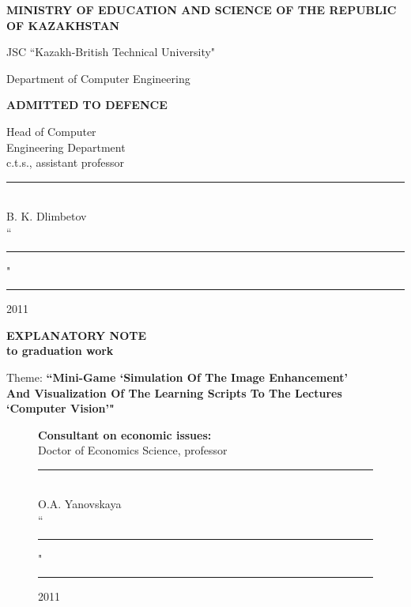 \begin{titlepage}
	\pagestyle{empty}
	\begin{center}
		{\bf{\MakeUppercase{Ministry of education and science of the republic of Kazakhstan}}

		\vspace{12pt}

		JSC ``Kazakh-British Technical University"


		Department of Computer Engineering}

		\begin{flushright}
			{\bf \MakeUppercase{Admitted to defence}}

			Head of Computer\\
			Engineering Department\\
			c.t.s., assistant professor\\
			\vspace{0.5\baselineskip}
			\rule{13em}{0.4pt}\\
			B. K. Dlimbetov\\
			\vspace{0.5\baselineskip}
			``\rule{2em}{0.4pt}" \rule{8em}{0.4pt} 2011\\
		\end{flushright}

		{\bf
		\MakeUppercase{Explanatory Note}\\
		to graduation work}

		\vspace{12pt}

		Theme: {\bf ``Mini-Game `Simulation Of The Image Enhancement' \\
		And Visualization Of The Learning Scripts To The Lectures \\
		`Computer Vision'"}

	\end{center}

	\begin{figure}[ht]
		\begin{minipage}[t]{0.5\linewidth}
			\begin{flushleft}
				{\bf Consultant on economic issues:}\\
				Doctor of Economics Science, professor\\
				\vspace{0.5\baselineskip}
				\rule{13em}{0.4pt}\\
				O.A. Yanovskaya\\
				\vspace{0.5\baselineskip}
				``\rule{2em}{0.4pt}" \rule{8em}{0.4pt} 2011\\
				\vspace{1\baselineskip}
				

\end{flushleft}
\end{minipage}
\end{figure}
\end{titlepage}
